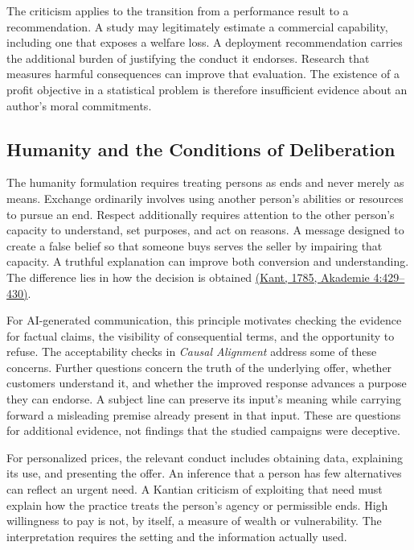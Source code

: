 The criticism applies to the transition from a performance result to a
recommendation. A study may legitimately estimate a commercial
capability, including one that exposes a welfare loss. A deployment
recommendation carries the additional burden of justifying the conduct
it endorses. Research that measures harmful consequences can improve
that evaluation. The existence of a profit objective in a statistical
problem is therefore insufficient evidence about an author's moral
commitments.

\hypertarget{M09-humanity-and-the-conditions-of-deliberation}{%
\subsection{Humanity and the Conditions of
Deliberation}\label{M09-humanity-and-the-conditions-of-deliberation}}

\noindent The humanity formulation requires treating persons as ends and never
merely as means. Exchange ordinarily involves using another person's
abilities or resources to pursue an end. Respect additionally requires
attention to the other person's capacity to understand, set purposes,
and act on reasons. A message designed to create a false belief so that
someone buys serves the seller by impairing that capacity. A truthful
explanation can improve both conversion and understanding. The
difference lies in how the decision is obtained
\href{https://www.gutenberg.org/ebooks/5682}{(Kant, 1785, Akademie
4:429--430)}.

For AI-generated communication, this principle motivates checking the
evidence for factual claims, the visibility of consequential terms, and
the opportunity to refuse. The acceptability checks in \emph{Causal
Alignment} address some of these concerns. Further questions concern the
truth of the underlying offer, whether customers understand it, and
whether the improved response advances a purpose they can endorse. A
subject line can preserve its input's meaning while carrying forward a
misleading premise already present in that input. These are questions
for additional evidence, not findings that the studied campaigns were
deceptive.

For personalized prices, the relevant conduct includes obtaining data,
explaining its use, and presenting the offer. An inference that a person
has few alternatives can reflect an urgent need. A Kantian criticism of
exploiting that need must explain how the practice treats the person's
agency or permissible ends. High willingness to pay is not, by itself, a
measure of wealth or vulnerability. The interpretation requires the
setting and the information actually used.

